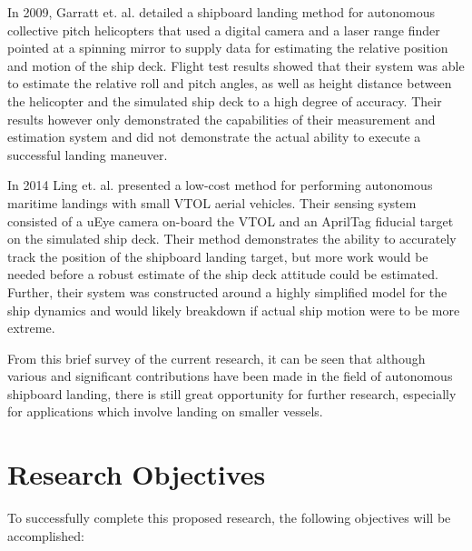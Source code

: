 \documentclass[12pt, letterpaper]{article}
\begin{document}

In 2009, Garratt et. al. \cite{Garratt2009} detailed a shipboard landing method for autonomous collective pitch helicopters that used a digital camera and a laser range finder pointed at a spinning mirror to supply data for estimating the relative position and motion of the ship deck.  Flight test results showed that their system was able to estimate the relative roll and pitch angles, as well as height distance between the helicopter and the simulated ship deck to a high degree of accuracy.  Their results however only demonstrated the capabilities of their measurement and estimation system and did not demonstrate the actual ability to execute a successful landing maneuver.
  
In 2014 Ling et. al. \cite{Ling2014} presented a low-cost method for performing autonomous maritime landings with small VTOL aerial vehicles.  Their sensing system consisted of a uEye camera on-board the VTOL and an AprilTag fiducial target on the simulated ship deck.  Their method demonstrates the ability to accurately track the position of the shipboard landing target, but more work would be needed before a robust estimate of the ship deck attitude could be estimated.  Further, their system was constructed around a highly simplified model for the ship dynamics and would likely breakdown if actual ship motion were to be more extreme.   


From this brief survey of the current research, it can be seen that although various and significant contributions have been made in the field of autonomous shipboard landing, there is still great opportunity for further research, especially for applications which involve landing on smaller vessels.

\section{Research Objectives}

To successfully complete this proposed research, the following objectives will be accomplished:
\end{document}
